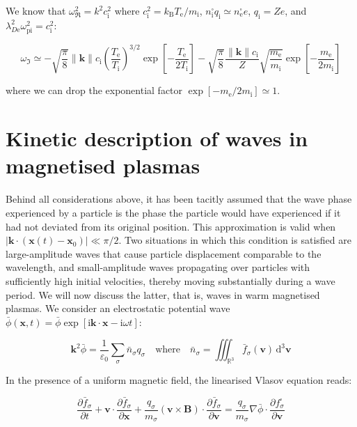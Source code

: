 We know that $\omega_\Re^2=k^2c_\mathrm{i}^2$ where $c_\mathrm{i}^2=k_\mathrm{B}T_\text{e}/m_\mathrm{i}$, $n_\mathrm{i}^\square q_\mathrm{i}\simeq n_\text{e}^\square e$, $q_\mathrm{i}=Ze$, and $\lambda_{D\text{e}}^2\omega_\text{pi}^2=c_\mathrm{i}^2$:

\begin{equation}
    \omega_\Im\simeq-\sqrt{\frac{\pi}{8}}\|\mathbf{k}\|c_\mathrm{i}\left(\frac{T_\text{e}}{T_\mathrm{i}}\right)^{3/2}\exp{\left[-\frac{T_\text{e}}{2T_\mathrm{i}}\right]}-\sqrt{\frac{\pi}{8}}\frac{\|\mathbf{k}\|c_\mathrm{i}}{Z}\sqrt{\frac{m_\text{e}}{m_\mathrm{i}}}\exp{\left[-\frac{m_\text{e}}{2m_\mathrm{i}}\right]}
\end{equation}

where we can drop the exponential factor $\exp{[-m_\text{e}/2m_\mathrm{i}]}\simeq1$.

\section{Kinetic description of waves in magnetised plasmas}

Behind all considerations above, it has been tacitly assumed that the wave phase experienced by a particle is the phase the particle would have experienced if it had not deviated from its original position. This approximation is valid when $|\mathbf{k}\cdot(\mathbf{x}(t)-\mathbf{x}_0)|\ll\pi/2$. Two situations in which this condition is satisfied are large-amplitude waves that cause particle displacement comparable to the wavelength, and small-amplitude waves propagating over particles with sufficiently high initial velocities, thereby moving substantially during a wave period. We will now discuss the latter, that is, waves in warm magnetised plasmas. We consider an electrostatic potential wave $\bar{\phi}(\mathbf{x},t)=\bar{\phi}\exp{[\mathrm{i}\mathbf{k}\cdot\mathbf{x}-\mathrm{i}\omega t]}$:

\begin{equation}
    \mathbf{k}^2\bar{\phi}=\frac{1}{\varepsilon_0}\sum_{\sigma}\bar{n}_\sigma q_\sigma\quad\text{where}\quad\bar{n}_\sigma=\iiint_{\mathbb{R}^3}\bar{f}_\sigma(\mathbf{v})\,\mathrm{d}^3\mathbf{v}
\end{equation}

In the presence of a uniform magnetic field, the linearised Vlasov equation reads:

\begin{equation}
    \frac{\partial\bar{f}_\sigma}{\partial t}+\mathbf{v}\cdot\frac{\partial\bar{f}_\sigma}{\partial\mathbf{x}}+\frac{q_\sigma}{m_\sigma}\left(\mathbf{v}\times\mathbf{B}\right)\cdot\frac{\partial\bar{f}_\sigma}{\partial\mathbf{v}}=\frac{q_\sigma}{m_\sigma}\nabla\bar{\phi}\cdot\frac{\partial f_\sigma^\square}{\partial\mathbf{v}}
\end{equation}

